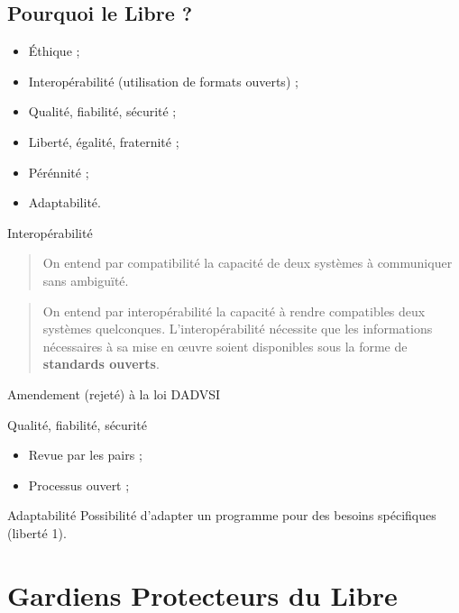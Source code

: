 \subsection{Pourquoi le Libre ?}

\begin{frame}
  \begin{itemize}
    \item Éthique ;
    \item Interopérabilité (utilisation de formats ouverts) ;
    \item Qualité, fiabilité, sécurité ;
    \item Liberté, égalité, fraternité ;
    \item Pérénnité ;
    \item Adaptabilité.
  \end{itemize}
\end{frame}

\begin{frame}{Interopérabilité}
  \begin{quote}\small
    On entend par compatibilité la capacité de deux systèmes à communiquer sans ambiguïté.
  \end{quote}
  \begin{quote}\small
    On entend par interopérabilité la capacité à rendre compatibles deux systèmes quelconques. L'interopérabilité nécessite que les informations nécessaires à sa mise en œuvre soient disponibles sous la forme de \textbf{standards ouverts}.
  \end{quote}
  \begin{flushright}
    Amendement (rejeté) à la loi DADVSI
  \end{flushright}
\end{frame}

\begin{frame}{Qualité, fiabilité, sécurité}
  \begin{itemize}
    \item Revue par les pairs ;
    \item Processus ouvert ;
  \end{itemize}
\end{frame}

\begin{frame}{Adaptabilité}
  Possibilité d'adapter un programme pour des besoins spécifiques (liberté 1).
\end{frame}

\section{Gardiens Protecteurs du Libre}

